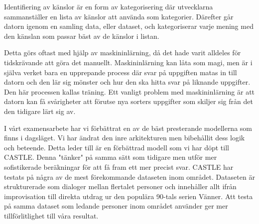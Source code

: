 \documentclass{popsci}
\begin{document}
{\noindent 

Identifiering av känslor är en form av kategorisering där utvecklarna sammanställer en lista av känslor att använda som kategorier. Därefter går datorn igenom en samling data, eller dataset, och kategoriserar varje mening med den känslan som passar bäst av de känslor i listan. 


Detta görs oftast med hjälp av maskininlärning, då det hade varit alldeles för tidskrävande att göra det manuellt. Maskininlärning kan låta som magi, men är i själva verket bara en upprepande process där svar på uppgiften matas in till datorn och den lär sig mönster och hur den ska hitta svar på liknande uppgifter. Den här processen kallas träning. Ett vanligt problem med maskininlärning är att datorn kan få svårigheter att förutse nya sorters uppgifter som skiljer sig från det den tidigare lärt sig av. 




I vårt examensarbete har vi förbättrat en av de bäst presterande modellerna som finns i dagsläget. Vi har ändrat den inre arkitekturen men bibehållit dess logik och beteende. Detta leder till är en förbättrad modell som vi har döpt till CASTLE. Denna "tänker" på samma sätt som tidigare men utför mer sofistikerade beräkningar för att få fram ett mer precist svar. CASTLE har testats på några av de mest förekommande dataseten inom området. Dataseten är strukturerade som dialoger mellan flertalet personer och innehåller allt ifrån improvisation till direkta utdrag ur den populära 90-tals serien Vänner. Att testa på samma dataset som ledande personer inom området använder ger mer tillförlitlighet till våra resultat. 




}
\end{document}
